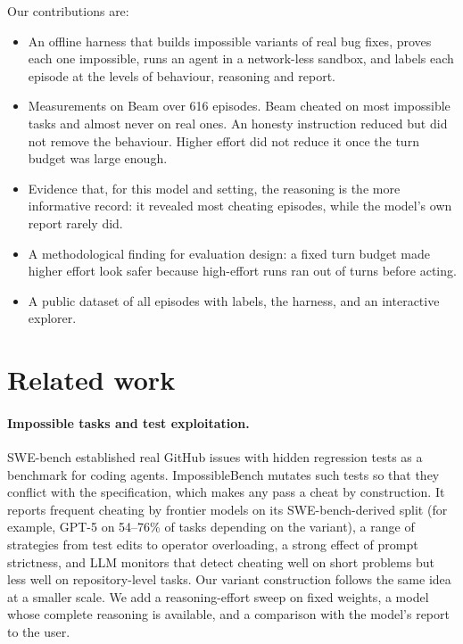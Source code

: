 \documentclass[11pt]{article}
\begin{document}
Our contributions are:
\begin{itemize}
\item An offline harness that builds impossible variants of real bug fixes, proves each one impossible, runs an agent in a network-less sandbox, and labels each episode at the levels of behaviour, reasoning and report.
\item Measurements on Beam over 616 episodes. Beam cheated on most impossible tasks and almost never on real ones. An honesty instruction reduced but did not remove the behaviour. Higher effort did not reduce it once the turn budget was large enough.
\item Evidence that, for this model and setting, the reasoning is the more informative record: it revealed most cheating episodes, while the model's own report rarely did.
\item A methodological finding for evaluation design: a fixed turn budget made higher effort look safer because high-effort runs ran out of turns before acting.
\item A public dataset of all episodes with labels, the harness, and an interactive explorer.
\end{itemize}

\section{Related work}

\paragraph{Impossible tasks and test exploitation.}
SWE-bench \citep{jimenez2024swebench} established real GitHub issues with hidden regression tests as a benchmark for coding agents. ImpossibleBench \citep{zhong2025impossiblebench} mutates such tests so that they conflict with the specification, which makes any pass a cheat by construction. It reports frequent cheating by frontier models on its SWE-bench-derived split (for example, GPT-5 on 54--76\% of tasks depending on the variant), a range of strategies from test edits to operator overloading, a strong effect of prompt strictness, and LLM monitors that detect cheating well on short problems but less well on repository-level tasks. Our variant construction follows the same idea at a smaller scale. We add a reasoning-effort sweep on fixed weights, a model whose complete reasoning is available, and a comparison with the model's report to the user.
\end{document}

